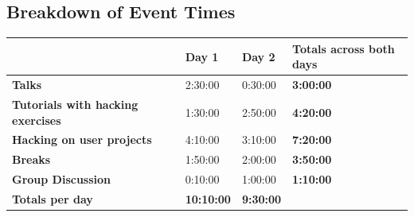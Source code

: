 \documentclass{article}
\begin{document}
\subsection{Breakdown of Event Times}
\label{sec:program:breakdown}

\begin{table}[h!]
\small
\label{tab:event:times}
\begin{tabular}{|l|l|l|l||l|}
\hline
                                          &                     & \textbf{Day 1}    & \textbf{Day 2}   & \textbf{Totals across both days} \\\hline
\textbf{Talks}                            & \cellcolor{blue!}   & 2:30:00           & 0:30:00          & \textbf{3:00:00}                 \\\hline
\textbf{Tutorials with hacking exercises} & \cellcolor{yellow!} & 1:30:00           & 2:50:00          & \textbf{4:20:00}                          \\\hline
\textbf{Hacking on user projects}         & \cellcolor{lime!} & 4:10:00           & 3:10:00          & \textbf{7:20:00}                          \\\hline
\textbf{Breaks}                           & \cellcolor{gray!25} & 1:50:00           & 2:00:00          & \textbf{3:50:00}                         \\\hline
\textbf{Group Discussion}                 & \cellcolor{gray!25} & 0:10:00           & 1:00:00          & \textbf{1:10:00}                          \\\hline \hline
\textbf{Totals per day}                   &                     & \textbf{10:10:00} & \textbf{9:30:00} &                                  \\\hline
\end{tabular}
\end{table}
\vspace{-0.3cm}
\end{document}
